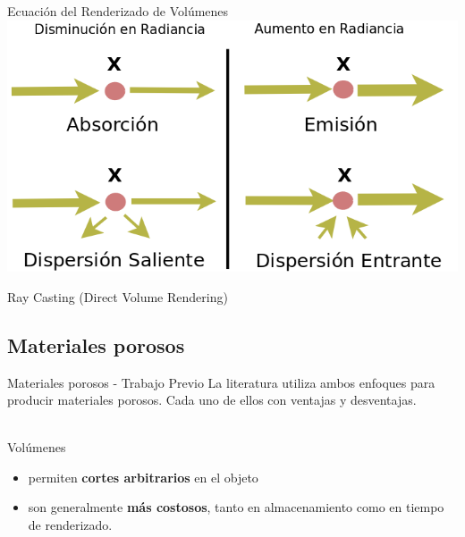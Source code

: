 \documentclass[spanish]{beamer}
\begin{document}
\begin{frame}{Ecuación del Renderizado de Volúmenes}
\includegraphics[scale = 0.55]{../figures/fenomenosrte}

Ray Casting (Direct Volume Rendering)
\end{frame}



\subsection{Materiales porosos}


\begin{frame}{Materiales porosos - Trabajo Previo}
La literatura utiliza ambos enfoques para producir materiales porosos. Cada uno de ellos con ventajas y desventajas.

\ \\

Volúmenes
\begin{block}{}
\begin{itemize}
\item permiten \textbf{cortes arbitrarios} en el objeto
\item son generalmente \textbf{más costosos}, tanto en almacenamiento como en tiempo de renderizado.
\end{itemize}
\end{block}
\end{frame}
\end{document}
